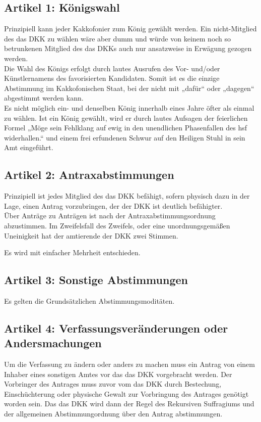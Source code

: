 \documentclass[ngerman, fontsize=12pt, parskip=half, footsepline]{scrartcl}
\begin{document}
\subsection*{Artikel 1: Königswahl}
Prinzipiell kann jeder Kakkofonier zum König gewählt werden. Ein nicht-Mitglied des das DKK zu wählen wäre aber dumm und würde von keinem noch so betrunkenen Mitglied des das DKKs auch nur ansatzweise in Erwägung gezogen werden.\\
Die Wahl des Königs erfolgt durch lautes Ausrufen des Vor- und/oder Künstlernamens des favorisierten Kandidaten. Somit ist es die einzige Abstimmung im Kakkofonischen Staat, bei der nicht mit „dafür“ oder „dagegen“ abgestimmt werden kann.\\
Es nicht möglich ein- und denselben König innerhalb eines Jahre öfter als einmal zu wählen.
Ist ein König gewählt, wird er durch lautes Aufsagen der feierlichen Formel „Möge sein Fehlklang auf ewig in den unendlichen Phasenfallen des hsf widerhallen.“ und einem frei erfundenen Schwur auf den Heiligen Stuhl in sein Amt eingeführt.

\subsection*{Artikel 2: Antraxabstimmungen}
Prinzipiell ist jedes Mitglied des das DKK befähigt, sofern physisch dazu in der Lage, einen Antrag vorzubringen, der der DKK ist deutlich befähigter.\\
Über Anträge zu Anträgen ist nach der Antraxabstimmungsordnung abzustimmen.
Im Zweifelsfall des Zweifels, oder eine unordnungsgemäßen Uneinigkeit hat der amtierende der DKK zwei Stimmen.

Es wird mit einfacher Mehrheit entschieden.

\subsection*{Artikel 3: Sonstige Abstimmungen}
Es gelten die Grundsätzlichen Abstimmungsmoditäten.\\

\subsection*{Artikel 4: Verfassungsveränderungen oder Andersmachungen}
Um die Verfassung zu ändern oder anders zu machen muss ein Antrag von einem Inhaber eines sonstigen Amtes vor das  das DKK vorgebracht werden.
Der Vorbringer des Antrages muss zuvor vom das DKK durch Bestechung, Einschüchterung oder physische Gewalt zur Vorbringung des Antrages genötigt worden sein.
Das das DKK wird dann der Regel des Rekursiven Suffragiums und der allgemeinen Abstimmungordnung über den Antrag abstimmungen.\\
\end{document}
